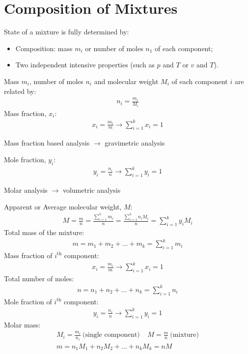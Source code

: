 \section{Composition of Mixtures}
State of a mixture is fully determined by:
\begin{itemize}
  \item Composition: mass $m_i$ or number of moles $n_1$ of each component;
  \item Two independent intensive properties (such as $p$ and $T$ or $v$ and $T$).
\end{itemize}
Mass $m_i$, number of moles $n_i$ and molecular weight $M_i$ of each component $i$ are related by:
\begin{gather}
  n_i = \frac{m_i}{M_i}
\end{gather}
Mass fraction, $x_i$:
\begin{gather}
  x_i = \frac{m_i}{m} \longrightarrow \sum_{i=1}^{k}x_i = 1
\end{gather}
\begin{center}
  Mass fraction based analysis $\longrightarrow$ gravimetric analysis
\end{center}
Mole fraction, $y_i$:
\begin{gather}
  y_i = \frac{n_i}{n} \longrightarrow \sum_{i=1}^{k}y_i = 1
\end{gather}
\begin{center}
  Molar analysis $\longrightarrow$ volumetric analysis
\end{center}
Apparent or Average molecular weight, $M$:
\begin{gather}
  M = \frac{m}{n} = \frac{\sum_{i=1}^{k}m_i}{n} = \frac{\sum_{i=1}^{k}n_i M_i}{n} = \sum_{i=1}^{k}y_i M_i
\end{gather}
Total mass of the mixture:
\begin{gather}
  m = m_1 + m_2 + \dots + m_k = \sum_{i=1}^{k}m_i
\end{gather}
Mass fraction of $i^{\text{th}}$ component:
\begin{gather}
  x_i = \frac{m_i}{m} \longrightarrow \sum_{i=1}^{k}x_i = 1
\end{gather}
Total number of moles:
\begin{gather}
  n = n_1 + n_2 + \dots + n_k = \sum_{i=1}^{k}n_i
\end{gather}
Mole fraction of $i^{\text{th}}$ component:
\begin{gather}
  y_i = \frac{n_i}{n} \longrightarrow \sum_{i=1}^{k}y_i = 1
\end{gather}
Molar mass:
\begin{gather}
  M_i = \frac{m_i}{n_i} \ \text{(single component)} \ \ \ \ \ M = \frac{m}{n} \ \text{(mixture)} \\[5pt]
  m = n_1M_1 + n_2M_2 + \dots + n_kM_k = nM
\end{gather}
